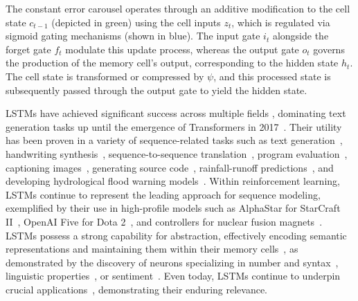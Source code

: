 The constant error carousel operates through an additive modification to the cell state $c_{t-1}$ (depicted in green) using the cell inputs $z_t$, which is regulated via sigmoid gating mechanisms (shown in blue). The input gate $i_t$ alongside the forget gate $f_t$ modulate this update process, whereas the output gate $o_t$ governs the production of the memory cell’s output, corresponding to the hidden state $h_t$. The cell state is transformed or compressed by $\psi$, and this processed state is subsequently passed through the output gate to yield the hidden state.

LSTMs have achieved significant success across multiple fields \citep{Hochreiter:01,Hochreiter:07,Schmidhuber:15}, dominating text generation tasks up until the emergence of Transformers in 2017~\citep{Vaswani:17}. Their utility has been proven in a variety of sequence-related tasks such as text generation~\citep{Graves:13,Karpathy:15blog}, handwriting synthesis~\citep{Graves:13}, sequence-to-sequence translation~\citep{Sutskever:14nips}, program evaluation~\citep{Zaremba:14arxiv}, captioning images~\citep{Karpathy:15,Hossain:19}, generating source code~\citep{Karpathy:15blog}, rainfall-runoff predictions~\citep{Kratzert:18,Kratzert:19}, and developing hydrological flood warning models~\citep{Nearing:24}. Within reinforcement learning, LSTMs continue to represent the leading approach for sequence modeling, exemplified by their use in high-profile models such as AlphaStar for StarCraft II~\citep{Vinyals:17short}, OpenAI Five for Dota 2~\citep{OpenAI:19}, and controllers for nuclear fusion magnets~\citep{Degrave:22short}. LSTMs possess a strong capability for abstraction, effectively encoding semantic representations and maintaining them within their memory cells~\citep{Karpathy:15blog}, as demonstrated by the discovery of neurons specializing in number and syntax~\citep{Lakretz:19}, linguistic properties~\citep{Bau:19}, or sentiment~\citep{Radford:17arxiv}. Even today, LSTMs continue to underpin crucial applications~\citep{Degrave:22short,Nearing:24}, demonstrating their enduring relevance.

